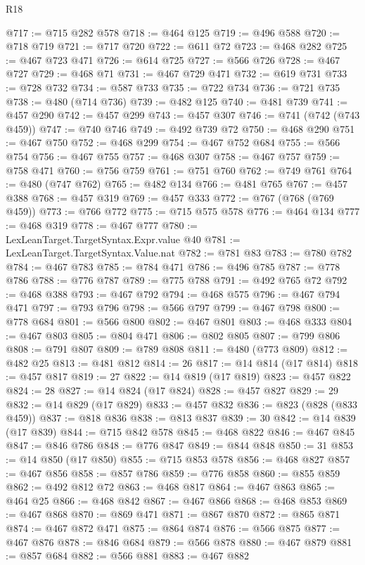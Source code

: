 \begin{lexlean}{R18}
\begin{coremodule}
@717 := @715 @282 @578
@718 := @464 @125
@719 := @496 @588
@720 := @718 @719
@721 := @717 @720
@722 := @611 @72
@723 := @468 @282
@725 := @467 @723 @471
@726 := @614 @725
@727 := @566 @726
@728 := @467 @727
@729 := @468 @71
@731 := @467 @729 @471
@732 := @619 @731
@733 := @728 @732
@734 := @587 @733
@735 := @722 @734
@736 := @721 @735
@738 := @480 (@714 @736)
@739 := @482 @125
@740 := @481 @739
@741 := @457 @290
@742 := @457 @299
@743 := @457 @307
@746 := @741 (@742 (@743 @459))
@747 := @740 @746
@749 := @492 @739 @72
@750 := @468 @290
@751 := @467 @750
@752 := @468 @299
@754 := @467 @752 @684
@755 := @566 @754
@756 := @467 @755
@757 := @468 @307
@758 := @467 @757
@759 := @758 @471
@760 := @756 @759
@761 := @751 @760
@762 := @749 @761
@764 := @480 (@747 @762)
@765 := @482 @134
@766 := @481 @765
@767 := @457 @388
@768 := @457 @319
@769 := @457 @333
@772 := @767 (@768 (@769 @459))
@773 := @766 @772
@775 := @715 @575 @578
@776 := @464 @134
@777 := @468 @319
@778 := @467 @777
@780 := LexLeanTarget.TargetSyntax.Expr.value @40
@781 := LexLeanTarget.TargetSyntax.Value.nat
@782 := @781 @83
@783 := @780 @782
@784 := @467 @783
@785 := @784 @471
@786 := @496 @785
@787 := @778 @786
@788 := @776 @787
@789 := @775 @788
@791 := @492 @765 @72
@792 := @468 @388
@793 := @467 @792
@794 := @468 @575
@796 := @467 @794 @471
@797 := @793 @796
@798 := @566 @797
@799 := @467 @798
@800 := @778 @684
@801 := @566 @800
@802 := @467 @801
@803 := @468 @333
@804 := @467 @803
@805 := @804 @471
@806 := @802 @805
@807 := @799 @806
@808 := @791 @807
@809 := @789 @808
@811 := @480 (@773 @809)
@812 := @482 @25
@813 := @481 @812
@814 := 26
@817 := @14 @814 (@17 @814)
@818 := @457 @817
@819 := 27
@822 := @14 @819 (@17 @819)
@823 := @457 @822
@824 := 28
@827 := @14 @824 (@17 @824)
@828 := @457 @827
@829 := 29
@832 := @14 @829 (@17 @829)
@833 := @457 @832
@836 := @823 (@828 (@833 @459))
@837 := @818 @836
@838 := @813 @837
@839 := 30
@842 := @14 @839 (@17 @839)
@844 := @715 @842 @578
@845 := @468 @822
@846 := @467 @845
@847 := @846 @786
@848 := @776 @847
@849 := @844 @848
@850 := 31
@853 := @14 @850 (@17 @850)
@855 := @715 @853 @578
@856 := @468 @827
@857 := @467 @856
@858 := @857 @786
@859 := @776 @858
@860 := @855 @859
@862 := @492 @812 @72
@863 := @468 @817
@864 := @467 @863
@865 := @464 @25
@866 := @468 @842
@867 := @467 @866
@868 := @468 @853
@869 := @467 @868
@870 := @869 @471
@871 := @867 @870
@872 := @865 @871
@874 := @467 @872 @471
@875 := @864 @874
@876 := @566 @875
@877 := @467 @876
@878 := @846 @684
@879 := @566 @878
@880 := @467 @879
@881 := @857 @684
@882 := @566 @881
@883 := @467 @882

\end{coremodule}
\end{lexlean}
